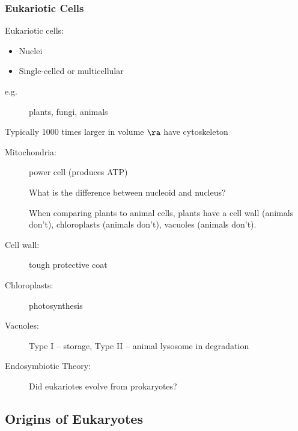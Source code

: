 \documentclass[11pt]{scrartcl}
\begin{document}
\subsubsection{Eukariotic Cells}
\begin{definition*}
  Eukariotic cells:
  \begin{itemize}
  \item Nuclei
  \item Single-celled or multicellular
  \end{itemize}  
  
\end{definition*}
\begin{description}

\item[e.g.] plants, fungi, animals

\end{description}

Typically 1000 times larger in volume \(\ra\) have cytoskeleton
\begin{description}

\item[Mitochondria:] power cell (produces ATP)

\begin{ques*}

  What is the difference between nucleoid and nucleus?

\end{ques*}

  When comparing plants to animal cells, plants have a cell wall
  (animals don't), chloroplasts (animals don't), vacuoles (animals don't).

\item[Cell wall:] tough protective coat

\item[Chloroplasts:] photosynthesis

\item[Vacuoles:] Type I -- storage, Type II -- animal lysosome in degradation

\item[Endosymbiotic Theory:] Did eukariotes evolve from prokaryotes?

\end{description}


\subsection{Origins of Eukaryotes}
\label{subsec:euk}
\end{document}
